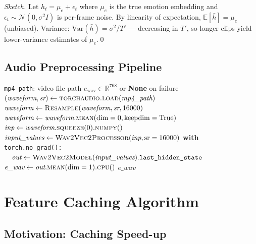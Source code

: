 \documentclass[12pt,a4paper]{article}
\theoremstyle{definition}
\theoremstyle{remark}
\begin{document}
\begin{proof}[Sketch]
Let $h_t = \mu_e + \epsilon_t$ where $\mu_e$ is the true emotion embedding
and $\epsilon_t \sim \mathcal{N}(0, \sigma^2 I)$ is per-frame noise.
By linearity of expectation, $\mathbb{E}[\bar{h}] = \mu_e$ (unbiased).
Variance: $\mathrm{Var}(\bar{h}) = \sigma^2/T'$ — decreasing in $T'$, so
longer clips yield lower-variance estimates of $\mu_e$.\qed
\end{proof}

\subsection{Audio Preprocessing Pipeline}

\begin{algorithm}[H]
\caption{Audio Preprocessing for Wav2Vec 2.0}
\label{alg:audio_preproc}
\begin{algorithmic}[1]
\Require \texttt{mp4\_path}: video file path
\Ensure $e_{\text{wav}} \in \mathbb{R}^{768}$ or \textbf{None} on failure
\State $(\textit{waveform}, \textit{sr}) \gets \textsc{torchaudio.load}(\textit{mp4\_path})$
       \Comment{$[C, T]$}
  \State $\textit{waveform} \gets \textsc{Resample}(\textit{waveform}, \textit{sr}, 16000)$
\EndIf
{}
  \State $\textit{waveform} \gets \textit{waveform}.\textsc{mean}(\text{dim}=0, \text{keepdim}=\text{True})$
\EndIf
\State $\textit{inp} \gets \textit{waveform}.\textsc{squeeze}(0).\textsc{numpy}()$
\State $\textit{input\_values} \gets \textsc{Wav2Vec2Processor}(\textit{inp}, \text{sr}=16000)$
\State \textbf{with} \texttt{torch.no\_grad():}
\State $\quad \textit{out} \gets \textsc{Wav2Vec2Model}(\textit{input\_values}).\texttt{last\_hidden\_state}$
       \Comment{$[1, T', 768]$}
\State $\textit{e\_wav} \gets \textit{out}.\textsc{mean}(\text{dim}=1).\textsc{cpu}()$
       \Comment{$[1, 768]$}
\State \Return $\textit{e\_wav}$
\end{algorithmic}
\end{algorithm}

\section{Feature Caching Algorithm}

\subsection{Motivation: Caching Speed-up}
\end{document}
